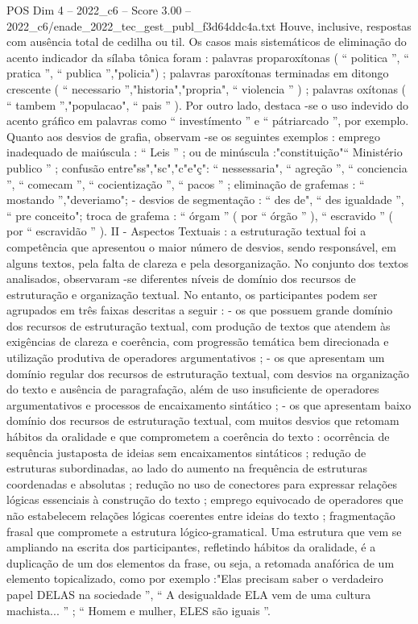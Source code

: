 \begin{textsample}{POS Dim 4 – 2022\_c6 – Score 3.00 – 2022\_c6/enade\_2022\_tec\_gest\_publ\_f3d64ddc4a.txt}
Houve, inclusive, respostas com ausência total de cedilha ou til.
Os casos mais sistemáticos de eliminação do acento indicador da sílaba tônica foram : palavras proparoxítonas ( “ politica ”, “ pratica ”, “ publica ”,"policia") ; palavras paroxítonas terminadas em ditongo crescente ( “ necessario ”,"historia","propria", “ violencia ” ) ; palavras oxítonas ( “ tambem ”,"populacao", “ pais ” ).
Por outro lado, destaca -se o uso indevido do acento gráfico em palavras como “ investímento ” e “ pátriarcado ”, por exemplo.
Quanto aos desvios de grafia, observam -se os seguintes exemplos : emprego inadequado de maiúscula : “ Leis ” ; ou de minúscula :"constituição"“ Ministério publico ” ; confusão entre"ss","sc","c"e"ç": “ nessessaria", “ agreção ”, “ conciencia ”, “ comecam ”, “ cocientização ”, “ pacos ” ; eliminação de grafemas : “ mostando ”,"deveriamo"; - desvios de segmentação : “ des de", “ des igualdade ”, “ pre conceito"; troca de grafema : “ órgam ” ( por “ órgão ” ), “ escravido ” ( por “ escravidão ” ).
II - Aspectos Textuais : a estruturação textual foi a competência que apresentou o maior número de desvios, sendo responsável, em alguns textos, pela falta de clareza e pela desorganização.
No conjunto dos textos analisados, observaram -se diferentes níveis de domínio dos recursos de estruturação e organização textual.
No entanto, os participantes podem ser agrupados em três faixas descritas a seguir : - os que possuem grande domínio dos recursos de estruturação textual, com produção de textos que atendem às exigências de clareza e coerência, com progressão temática bem direcionada e utilização produtiva de operadores argumentativos ; - os que apresentam um domínio regular dos recursos de estruturação textual, com desvios na organização do texto e ausência de paragrafação, além de uso insuficiente de operadores argumentativos e processos de encaixamento sintático ; - os que apresentam baixo domínio dos recursos de estruturação textual, com muitos desvios que retomam hábitos da oralidade e que comprometem a coerência do texto : ocorrência de sequência justaposta de ideias sem encaixamentos sintáticos ; redução de estruturas subordinadas, ao lado do aumento na frequência de estruturas coordenadas e absolutas ; redução no uso de conectores para expressar relações lógicas essenciais à construção do texto ; emprego equivocado de operadores que não estabelecem relações lógicas coerentes entre ideias do texto ; fragmentação frasal que compromete a estrutura lógico-gramatical.
Uma estrutura que vem se ampliando na escrita dos participantes, refletindo hábitos da oralidade, é a duplicação de um dos elementos da frase, ou seja, a retomada anafórica de um elemento topicalizado, como por exemplo :"Elas precisam saber o verdadeiro papel DELAS na sociedade ”, “ A desigualdade ELA vem de uma cultura machista... ” ; “ Homem e mulher, ELES são iguais ”.

\end{textsample}
